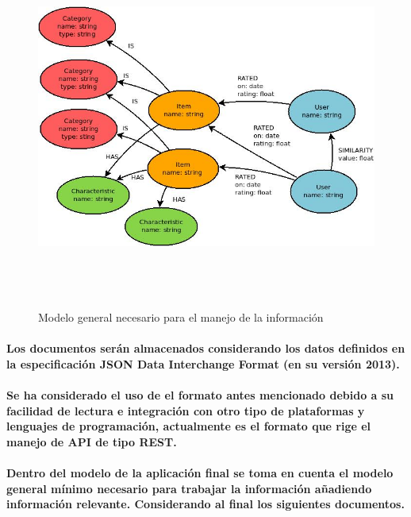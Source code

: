 \newpage
    \begin{landscape}
      \begin{figure}[h!]
      \centering
      \includegraphics[width=22.5cm,height=12cm]{./images/general.jpg}
      \caption{Modelo general necesario para el manejo de la información}
    \end{figure}
    \end{landscape}
  \newpage

\paragraph{Los documentos serán almacenados considerando los datos definidos en la especificación JSON Data Interchange Format (en su versión 2013). \cite{16}}

\paragraph{Se ha considerado el uso de el formato antes mencionado debido a su facilidad de lectura e integración con otro tipo de plataformas y lenguajes de programación, actualmente es el formato que rige el manejo de API de tipo REST.}

\paragraph{Dentro del modelo de la aplicación final se toma en cuenta el modelo general mínimo necesario para trabajar la información añadiendo información relevante. Considerando al final los siguientes documentos.}

